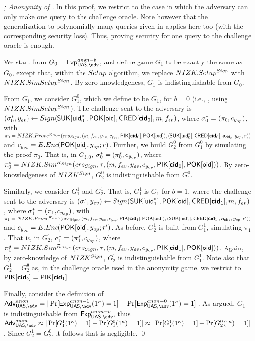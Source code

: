 \begin{proof}[; Anonymity of \CUASGen]
  In this proof, we restrict to the case in which the adversary can only make
  one query to the challenge oracle. Note however that the generalization to
  polynomially many queries given in \cite{bsz05} applies here too (with the
  corresponding security loss). Thus, proving security for one query to the
  challenge oracle is enough.

  We start from $G_0=\ExpAnonb$, and define game $G_1$ to be exactly the same
  as $G_0$, except that, within the $Setup$ algorithm, we replace
  $NIZK.Setup^{Sign}$ with $NIZK.SimSetup^{Sign}$. By zero-knowledgeness,
  $G_1$ is indistinguishable from $G_0$.
  
  From $G_1$, we consider $G^0_1$, which we define to be $G_1$, for $b=0$
  (i.e., \ExpAnonz, using $NIZK.SimSetup^{Sign}$). The challenge sent to the
  adversary is $(\mathsf{\sigma}^*_0,y_{ev}) \gets Sign(\mathsf{S}\mathsf{UK}[\mathsf{uid}^*_0],\mathsf{P}\mathsf{OK}[\mathsf{oid}],
  \mathsf{CRED}[\boldsymbol{\mathsf{cid}}_0],m,f_{ev})$, where $\mathsf{\sigma}^*_0 = (\pi_0,c_{y_{op}})$, with
  $\pi_0 = NIZK.Prove^{\mathcal{R}_{Sign}}(crs_{Sign},(m,f_{ev},y_{ev},
  c_{y_{op}},\mathsf{P}\mathsf{IK}[\boldsymbol{\mathsf{cid}}_0],\mathsf{P}\mathsf{OK}[\mathsf{oid}]),(\mathsf{S}\mathsf{UK}[\mathsf{uid}^*_0],
  \mathsf{CRED}[\boldsymbol{\mathsf{cid}}_0],\mathbf{a}_{\boldsymbol{\mathsf{cid}}_0},y_{op},r))$ and $c_{y_{op}} =
  E.Enc(\mathsf{P}\mathsf{OK}[\mathsf{oid}],y_{op};r)$.
  Further, we build $G_2^0$ from $G_1^0$ by simulating the proof $\pi_0$. That
  is, in $G_{2,0}$, $\mathsf{\sigma}^*_0 = (\pi_0^s,c_{y_{op}})$, where $\pi^s_0 =
  NIZK.Sim^{\mathcal{R}_{Sign}}(crs_{Sign},\tau,(m,f_{ev},y_{ev},
  c_{y_{op}},\mathsf{P}\mathsf{IK}[\boldsymbol{\mathsf{cid}}_0],\mathsf{P}\mathsf{OK}[\mathsf{oid}]))$. By zero-knowledgeness
  of $NIZK^{Sign}$, $G_2^0$ is indistinguishable from $G_1^0$.

  Similarly, we consider $G_1^1$ and $G_2^1$. That is, $G_1^1$ is $G_1$
  for $b=1$, where the challenge
  sent to the adversary is $(\mathsf{\sigma}^*_1,y_{ev}) \gets Sign(\mathsf{S}\mathsf{UK}[\mathsf{uid}^*_1],
  \mathsf{P}\mathsf{OK}[\mathsf{oid}],\mathsf{CRED}[\boldsymbol{\mathsf{cid}}_1],m,f_{ev})$, where $\mathsf{\sigma}^*_1 = (\pi_1,
  c_{y_{op}})$, with $\pi_1 = NIZK.Prove^{\mathcal{R}_{Sign}}(crs_{Sign},
  (m,f_{ev},y_{ev},c_{y_{op}},\mathsf{P}\mathsf{IK}[\boldsymbol{\mathsf{cid}}_1],\mathsf{P}\mathsf{OK}[\mathsf{oid}]),
  (\mathsf{S}\mathsf{UK}[\mathsf{uid}^*_1],\mathsf{CRED}[\boldsymbol{\mathsf{cid}}_1],\mathbf{a}_{\boldsymbol{\mathsf{cid}}_1},y_{op},r'))$ and $c_{y_{op}}
  = E.Enc(\mathsf{P}\mathsf{OK}[\mathsf{oid}],y_{op};r')$. As before, $G_2^1$ is built from $G_1^1$,
  simulating $\pi_1$. That is, in $G_2^1$, $\mathsf{\sigma}^*_1 = (\pi_1^s,c_{y_{op}})$,
  where $\pi^s_1 = NIZK.Sim^{\mathcal{R}_{Sign}}(crs_{Sign},\tau,(m,
  f_{ev},y_{ev},c_{y_{op}},\mathsf{P}\mathsf{IK}[\boldsymbol{\mathsf{cid}}_1],\mathsf{P}\mathsf{OK}[\mathsf{oid}]))$. Again, by
  zero-knowledge of $NIZK^{Sign}$, $G_2^1$ is indistinguishable from $G_1^1$.
  Note also that $G_2^1=G_2^0$ as, in the challenge oracle used in the
  anonymity game, we restrict to $\mathsf{P}\mathsf{IK}[\boldsymbol{\mathsf{cid}}_0] = \mathsf{P}\mathsf{IK}[\boldsymbol{\mathsf{cid}}_1]$.

  Finally, consider the definition of $\AdvAnon=|\Pr\lbrack
  \ExpAnono(1^\secpar)=1\rbrack-\Pr\lbrack\ExpAnonz(1^\secpar)=1\rbrack|$. As
  argued, $G_1$ is indistinguishable from $\ExpAnonb$, thus
  $\AdvAnon \approx |\Pr\lbrack G_1^1(1^\secpar)=1\rbrack-\Pr\lbrack
  G_1^0(1^\secpar)=1\rbrack| \approx
  |\Pr\lbrack G_2^1(1^\secpar)=1\rbrack-\Pr\lbrack
  G_2^0(1^\secpar)=1\rbrack|$. Since $G_2^1=G_2^0$, it follows that
  \AdvAnon is negligible.
  \qed
\end{proof}

